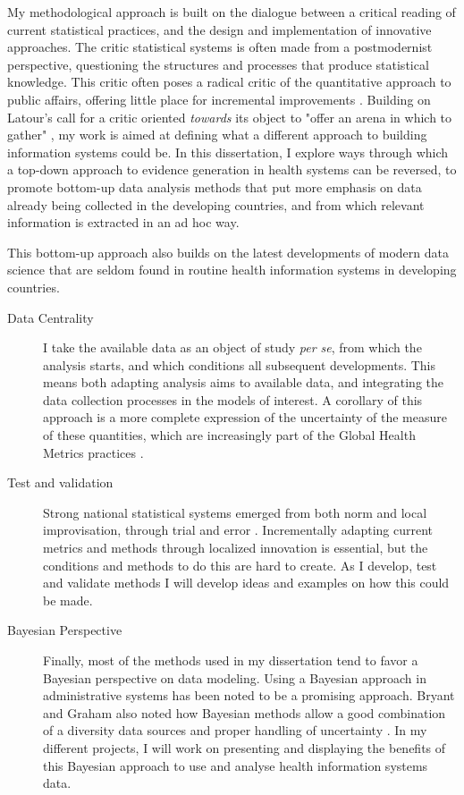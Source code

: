My methodological approach is built on the dialogue between a critical reading of current statistical practices, and the design and implementation of innovative approaches. The critic statistical systems is often made from a postmodernist perspective, questioning the structures and processes that produce statistical knowledge. This critic  often poses a radical critic of the quantitative approach to public affairs, offering little place for incremental improvements \citep{rottenburg_world_2016}. Building on Latour's call for a critic oriented \textit{towards} its object to "offer an arena in which to gather" \citep{latour_why_2004}, my work is aimed at defining what a different approach to building information systems could be. In this dissertation, I explore ways through which a top-down approach to evidence generation in health systems can be reversed, to promote  bottom-up data analysis methods that put more emphasis on data already being collected in the developing countries, and from which relevant information is extracted in an ad hoc way.

This bottom-up approach also builds on the latest developments of modern data science that are seldom found in routine health information systems in developing countries.

\begin{description}
\item[Data Centrality] I take the available data as an object of study \textit{per se}, from which the analysis starts, and which conditions all subsequent developments. This means both adapting analysis aims to available data, and integrating the data collection processes in the models of interest. A corollary of this approach is a more complete expression of the uncertainty of the measure of these quantities, which are increasingly part of the Global Health Metrics practices \citep{murray_towards_2007}.
\item[Test and validation] Strong national statistical systems emerged from both norm and local improvisation, through trial and error \citep{lecuyer_medecins_1987,chaperon_information_1988}. Incrementally adapting current metrics and  methods through localized innovation is essential, but the conditions and methods to do this are hard to create. As I develop, test and validate methods I will develop ideas and examples on how this could be made.
\item[Bayesian Perspective] Finally, most of the methods used in my dissertation tend to favor a Bayesian perspective on data modeling. Using a Bayesian approach in administrative systems has been noted to be a promising approach\citep{fienberg_bayesian_2011,little_calibrated_2012}. Bryant and Graham also noted how Bayesian methods allow a good combination of a diversity data sources and proper handling of uncertainty \citep{bryant_bayesian_2013}. In my different projects, I will work on presenting and displaying the benefits of this Bayesian approach to use and analyse health information systems data.
\end{description}


